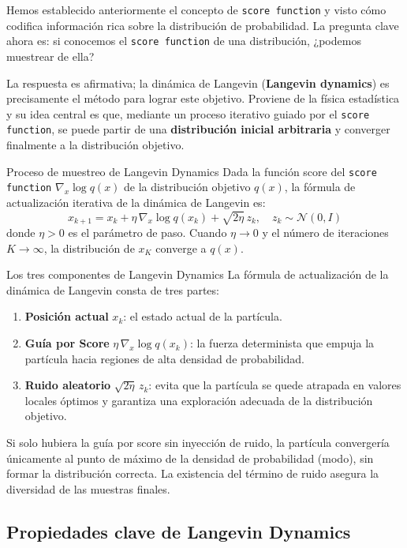 \documentclass[a4paper]{article}
\begin{document}
Hemos establecido anteriormente el concepto de \texttt{score function} y visto cómo codifica información rica sobre la distribución de probabilidad. La pregunta clave ahora es: si conocemos el \texttt{score function} de una distribución, ¿podemos muestrear de ella?

La respuesta es afirmativa; la dinámica de Langevin (\textbf{Langevin dynamics}) es precisamente el método para lograr este objetivo. Proviene de la física estadística y su idea central es que, mediante un proceso iterativo guiado por el \texttt{score function}, se puede partir de una \textbf{distribución inicial arbitraria} y converger finalmente a la distribución objetivo.

\begin{importantbox}{Proceso de muestreo de Langevin Dynamics}
Dada la función score del \texttt{score function} $\nabla_x \log q(x)$ de la distribución objetivo $q(x)$, la fórmula de actualización iterativa de la dinámica de Langevin es:
$$x_{k+1} = x_k + \eta\, \nabla_x \log q(x_k) + \sqrt{2\eta}\, z_k, \quad z_k \sim \mathcal{N}(0, I)$$
donde $\eta > 0$ es el parámetro de paso. Cuando $\eta \to 0$ y el número de iteraciones $K \to \infty$, la distribución de $x_K$ converge a $q(x)$.
\end{importantbox}

\begin{knowledgebox}{Los tres componentes de Langevin Dynamics}
La fórmula de actualización de la dinámica de Langevin consta de tres partes:
\begin{enumerate}
    \item \textbf{Posición actual} $x_k$: el estado actual de la partícula.
    \item \textbf{Guía por Score} $\eta\, \nabla_x \log q(x_k)$: la fuerza determinista que empuja la partícula hacia regiones de alta densidad de probabilidad.
    \item \textbf{Ruido aleatorio} $\sqrt{2\eta}\, z_k$: evita que la partícula se quede atrapada en valores locales óptimos y garantiza una exploración adecuada de la distribución objetivo.
\end{enumerate}
Si solo hubiera la guía por score sin inyección de ruido, la partícula convergería únicamente al punto de máximo de la densidad de probabilidad (modo), sin formar la distribución correcta. La existencia del término de ruido asegura la diversidad de las muestras finales.
\end{knowledgebox}

\subsection{Propiedades clave de Langevin Dynamics}
\end{document}
